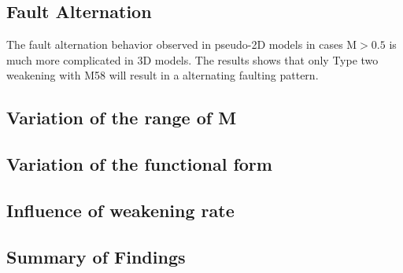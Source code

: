 \subsection{Fault Alternation}
The fault alternation behavior observed in pseudo-2D models in cases M$>0.5$ is much more complicated in 3D models. The results shows that only Type two weakening with M58 will result in a alternating faulting pattern. 

\subsection{Variation of the range of M}

\subsection{Variation of the functional form}

\subsection{Influence of weakening rate}

\subsection{Summary of Findings}
